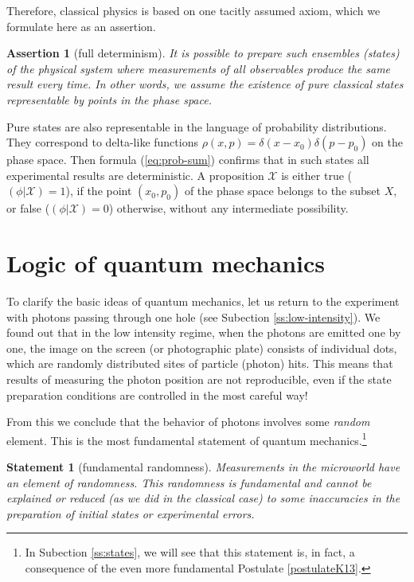 \documentclass[nochecklpage]{stefan1}
\newtheorem{assertion}[theorem]{Assertion}
\newtheorem{statement}[theorem]{Statement}
\theoremstyle{definition}
\begin{document}
Therefore, classical physics is based on one tacitly assumed axiom,
which we formulate here as an assertion.

\begin{assertion}[full determinism]
\label{assertionJ_c}It is possible to prepare such ensembles (states) of the physical system
where measurements of all observables produce the same result every time.
In other words, we assume the existence of pure classical states
representable by points in the phase space. \end{assertion}

Pure states are also representable in the language of probability
distributions. They correspond to delta-like functions $ \rho (x, p) =
\delta (x-x_{0}) \delta (p-p_{0}) $ on the phase space. Then formula
(\ref{eq:prob-sum}) confirms that in such states all experimental
results are deterministic. A proposition $\mathcal{X} $ is either true
($ (\phi | \mathcal{X}) = 1 $), if the point $(x_{0}, p_{0}) $ of the
phase space belongs to the subset $ X $, or false ($ (\phi |
\mathcal{X}) = 0 $) otherwise, without any intermediate possibility.

\section{Logic of quantum mechanics}\label{sc:1.3}
To clarify the basic ideas of quantum mechanics, let us return to the
experiment with photons passing through one hole (see Subection
\ref{ss:low-intensity}). We found out that in the low intensity regime, when
the photons are emitted one by one, the image on the screen (or
photographic plate) consists of individual dots, which are randomly
distributed sites of particle (photon) hits. This means that results of
measuring the photon position are not reproducible, even if the state
preparation conditions are controlled in the most careful way!

From this we conclude that the behavior of photons involves some
\emph{random} element. This is the most fundamental statement of quantum
mechanics.\footnote{In Subection \ref{ss:states}, we will see that this
statement is, in fact, a consequence of the even more fundamental
Postulate \ref{postulateK13}.}

\begin{statement}[fundamental randomness]
\label{postulateJ2}Measurements in the microworld have an element of randomness. This
randomness is fundamental and cannot be explained or reduced \textup{(}as we did
in the classical case\textup{)} to some inaccuracies in the preparation of
initial states or experimental errors.
\end{statement}
\end{document}
